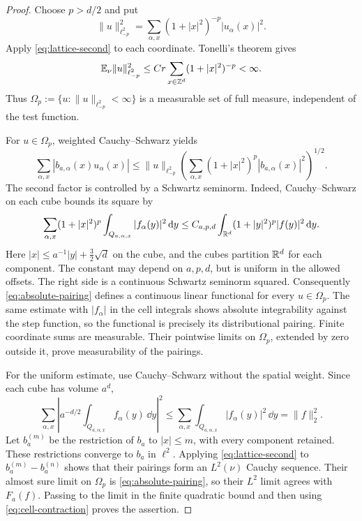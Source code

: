 \documentclass[11pt,letterpaper,reqno]{amsart}
\begin{document}
\begin{proof}
Choose $p>d/2$ and put
\[
 \|u\|_{\ell^2_{-p}}^2
 =\sum_{\alpha,x}(1+|x|^2)^{-p}|u_\alpha(x)|^2.
\]
Apply \eqref{eq:lattice-second} to each coordinate. Tonelli's
theorem gives
\begin{equation}\label{eq:lattice-weighted}
 \mathbb E_\nu\|u\|_{\ell^2_{-p}}^2
 \le Cr\sum_{x\in\mathbb Z^d}(1+|x|^2)^{-p}<\infty.
\end{equation}
Thus $\Omega_p:=\{u:\|u\|_{\ell^2_{-p}}<\infty\}$ is a
measurable set of full measure, independent of the test function.

For $u\in\Omega_p$, weighted Cauchy--Schwarz yields
\begin{equation}\label{eq:weighted-pairing}
 \sum_{\alpha,x}|b_{a,\alpha}(x)u_\alpha(x)|
 \le\|u\|_{\ell^2_{-p}}
 \left(\sum_{\alpha,x}(1+|x|^2)^p
                       |b_{a,\alpha}(x)|^2\right)^{1/2}.
\end{equation}
The second factor is controlled by a Schwartz seminorm. Indeed,
Cauchy--Schwarz on each cube bounds its square by
\[
 \sum_{\alpha,x}(1+|x|^2)^p
             \int_{Q_{a,\alpha,x}}|f_\alpha(y)|^2\,\mathrm d y
 \le C_{a,p,d}\int_{\mathbb R^d}(1+|y|^2)^p|f(y)|^2\,\mathrm d y.
\]
Here $|x|\le a^{-1}|y|+\tfrac32\sqrt d$ on the cube, and
the cubes partition $\mathbb R^d$ for each component. The constant may
depend on $a,p,d$, but is uniform in the allowed offsets.
The right side is a continuous Schwartz seminorm squared.
Consequently \eqref{eq:absolute-pairing} defines a continuous
linear functional for every $u\in\Omega_p$. The same estimate
with $|f_\alpha|$ in the cell integrals shows absolute
integrability against the step function, so the functional is
precisely its distributional pairing. Finite coordinate sums are
measurable. Their pointwise limits on $\Omega_p$, extended by zero
outside it, prove measurability of the pairings.

For the uniform estimate, use Cauchy--Schwarz without the spatial
weight. Since each cube has volume $a^d$,
\begin{equation}\label{eq:cell-contraction}
 \sum_{\alpha,x}\left|a^{-d/2}
               \int_{Q_{a,\alpha,x}}f_\alpha(y)\,\dd y\right|^2
 \le\sum_{\alpha,x}\int_{Q_{a,\alpha,x}}|f_\alpha(y)|^2\,\dd y
 =\|f\|_2^2.
\end{equation}
Let $b_a^{(m)}$ be the restriction of $b_a$ to $|x|\le m$,
with every component retained. These restrictions converge to $b_a$
in $\ell^2$. Applying \eqref{eq:lattice-second} to
$b_a^{(m)}-b_a^{(n)}$ shows that their pairings form an
$L^2(\nu)$ Cauchy sequence. Their almost sure limit on $\Omega_p$
is \eqref{eq:absolute-pairing}, so their $L^2$ limit agrees with
$F_a(f)$. Passing to the limit in the finite quadratic bound and
then using \eqref{eq:cell-contraction} proves the assertion.
\end{proof}
\end{document}
